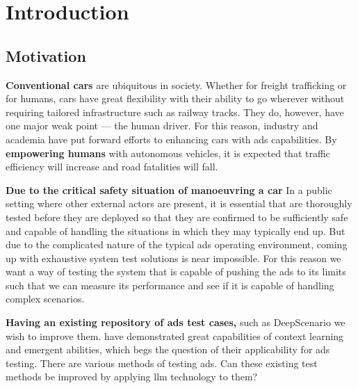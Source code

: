 \chapter{Introduction}


\section{Motivation}

\textbf{Conventional cars} are ubiquitous in society. Whether for freight trafficking or for humans, cars have great flexibility with their ability to go wherever without requiring tailored infrastructure
such as railway tracks. They do, however, have one major weak point --- the human driver. For this
reason, industry and academia have put forward efforts to enhancing cars with \acrfull{ads}
capabilities.
By \textbf{empowering humans} with autonomous vehicles, it is expected that traffic efficiency will
increase and road fatalities will fall.

\textbf{Due to the critical safety situation of manoeuvring a car} In a public setting where other external
actors are present, it is essential that  are thoroughly tested before they are
deployed so that they are confirmed to be sufficiently safe and capable of handling the situations in which
they may typically end up.
But due to the complicated nature of the typical \acrshort{ads} operating environment, coming up with
exhaustive system test solutions is near impossible.
For this reason we want a way of testing the system that is capable of pushing the \acrlong{ads} to
its limits such that we can measure its performance and see if it is capable of
handling complex scenarios.

\textbf{Having an existing repository of \acrlong{ads} test cases,} such as
DeepScenario we wish to improve them. \textbf{} have demonstrated
great capabilities of context learning and emergent abilities, which begs
the question of their  applicability for \acrshort{ads} testing.  There are
various methods of testing  \acrlong{ads}. Can these existing test methods be
improved by applying \acrshort{llm} technology to them?


